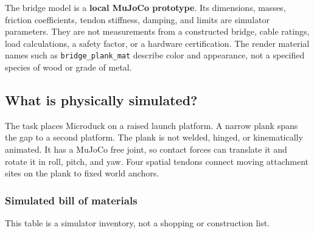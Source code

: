 \documentclass[
  american,
  11pt,
  letterpaper,
]{article}
\begin{document}
The bridge model is a \textbf{local MuJoCo prototype}. Its dimensions,
masses, friction coefficients, tendon stiffness, damping, and limits are
simulator parameters. They are not measurements from a constructed
bridge, cable ratings, load calculations, a safety factor, or a hardware
certification. The render material names such as
\texttt{bridge\_\allowbreak{}plank\_\allowbreak{}mat} describe color and
appearance, not a specified species of wood or grade of metal.

\subsection{What is physically
simulated?}\label{what-is-physically-simulated}

The task places Microduck on a raised launch platform. A narrow plank
spans the gap to a second platform. The plank is not welded, hinged, or
kinematically animated. It has a MuJoCo free joint, so contact forces
can translate it and rotate it in roll, pitch, and yaw. Four spatial
tendons connect moving attachment sites on the plank to fixed world
anchors.

\subsubsection{Simulated bill of
materials}\label{simulated-bill-of-materials}

This table is a simulator inventory, not a shopping or construction
list.
\end{document}
